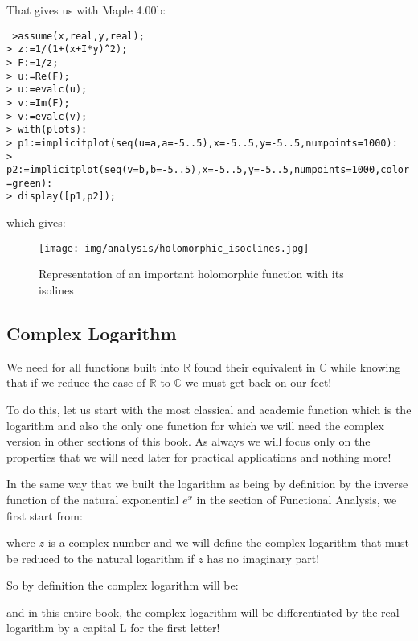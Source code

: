 	That gives us with Maple 4.00b:
	
	\texttt{
	>assume(x,real,y,real);\\
	> z:=1/(1+(x+I*y)\string^2);\\
	> F:=1/z;\\
	> u:=Re(F);\\
	> u:=evalc(u);\\
	> v:=Im(F);\\
	> v:=evalc(v);\\
	> with(plots):\\
	> p1:=implicitplot({seq(u=a,a=-5..5)},x=-5..5,y=-5..5,numpoints=1000):\\
	> p2:=implicitplot({seq(v=b,b=-5..5)},x=-5..5,y=-5..5,numpoints=1000,color=green):\\
	> display([p1,p2]);
	}
	
	which gives:
	\begin{figure}[H]
		\begin{center}
			\texttt{[image: img/analysis/holomorphic\_isoclines.jpg]}
		\end{center}	
		\caption{Representation of an important holomorphic function with its isolines}
	\end{figure}
	
	\subsection{Complex Logarithm}
	We need for all functions built into $\mathbb{R}$ found their equivalent in $\mathbb{C}$ while knowing that if we reduce the case of $\mathbb{R}$ to $\mathbb{C}$ we must get back on our feet!
	
	To do this, let us start with the most classical and academic function which is the logarithm and also the only one function for which we will need the complex version in other sections of this book. As always we will focus only on the properties that we will need later for practical applications and nothing more!
	
	In the same way that we built the logarithm as being by definition by the inverse function of the natural exponential $e^x$ in the section of Functional Analysis, we first start from:
	
	where $z$ is a complex number and we will define the complex logarithm that must be reduced to the natural logarithm if $z$ has no imaginary part!
	
	So by definition the complex logarithm will be:
	
	and in this entire book, the complex logarithm will be differentiated by the real logarithm by a capital L for the first letter!
	
